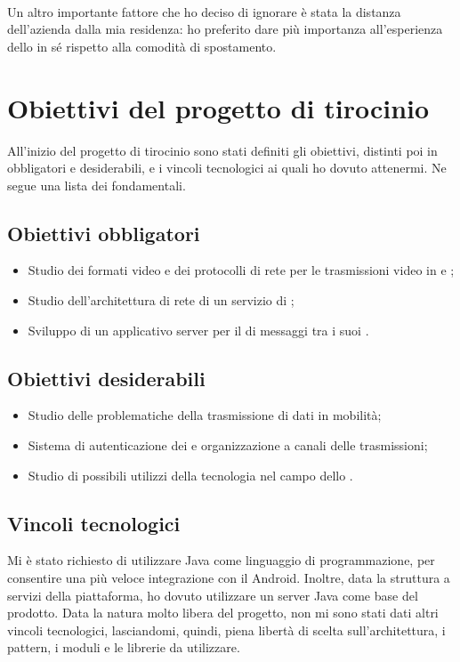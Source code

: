    \paragraph*{}
   Un altro importante fattore che ho deciso di ignorare è stata la distanza dell'azienda dalla mia residenza: ho preferito dare più importanza all'esperienza dello  in sé rispetto alla comodità di spostamento.

\section{Obiettivi del progetto di tirocinio}
All'inizio del progetto di tirocinio sono stati definiti gli obiettivi, distinti poi in obbligatori e desiderabili, e i vincoli tecnologici ai quali ho dovuto attenermi. Ne segue una lista dei fondamentali.

   \subsection{Obiettivi obbligatori}
   \begin{itemize}
      \item{Studio dei formati video e dei protocolli di rete per le trasmissioni video in  e ;}
      \item{Studio dell'architettura di rete di un servizio di ;}
      \item{Sviluppo di un applicativo server per il  di messaggi tra i suoi .}
   \end{itemize}

   \subsection{Obiettivi desiderabili}
   \begin{itemize}
      \item{Studio delle problematiche della trasmissione di dati in mobilità;}
      \item{Sistema di autenticazione dei  e organizzazione a canali delle trasmissioni;}
      \item{Studio di possibili utilizzi della tecnologia  nel campo dello .}
   \end{itemize}

   \subsection{Vincoli tecnologici}
   Mi è stato richiesto di utilizzare Java come linguaggio di programmazione, per consentire una più veloce integrazione con il  Android. Inoltre, data la struttura a servizi della piattaforma, ho dovuto utilizzare un server Java come base del prodotto. Data la natura molto libera del progetto, non mi sono stati dati altri vincoli tecnologici, lasciandomi, quindi, piena libertà di scelta sull'architettura, i pattern, i moduli e le librerie da utilizzare.


